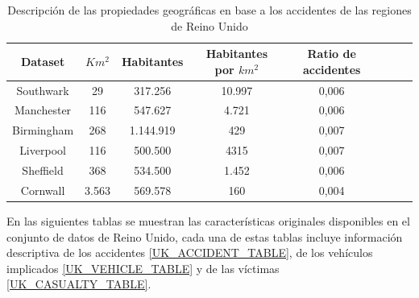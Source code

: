 \begin{table}[h!]
	\begin{center}
		\begin{tabular}{|c|c||c|c|c|c|c|c|}
			\hline
			\textbf{Dataset} & \textbf{$Km^2$} & \textbf{Habitantes} & \textbf{Habitantes por $km^2$} & \textbf{Ratio de accidentes}
			\\ \hline \hline
			Southwark   &  29   &   317.256  & 10.997  & 0,006 \\ \hline
			Manchester  &  116  &   547.627  &  4.721  & 0,006 \\ \hline
			Birmingham  &  268  & 1.144.919  &    429  & 0,007 \\ \hline
			Liverpool   &  116  &   500.500  &   4315  & 0,007 \\ \hline
			Sheffield   &  368  &   534.500  &  1.452  & 0,006  \\ \hline
			Cornwall    & 3.563 &   569.578  &    160  & 0,004 \\ \hline
		\end{tabular}
	\end{center}
	\caption{Descripción de las propiedades geográficas en base a los accidentes de las regiones de Reino Unido}
	\label{UK_statistics}
\end{table}


En las siguientes tablas se muestran las características originales disponibles en el conjunto de datos de Reino Unido, cada una de estas tablas incluye información descriptiva de los accidentes \ref{UK_ACCIDENT_TABLE}, de los vehículos implicados \ref{UK_VEHICLE_TABLE} y de las víctimas \ref{UK_CASUALTY_TABLE}.

